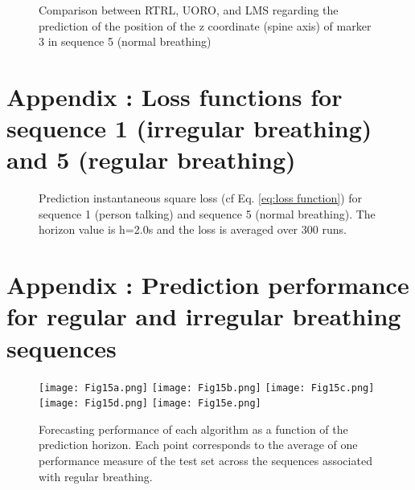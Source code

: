\documentclass[twocolumn,a4paper]{svjour3} \sloppy          \smartqed
\begin{document}
\begin{figure}[hbt!]
	
    \centering
    \quad
    \quad
    \caption{Comparison between RTRL, UORO, and LMS regarding the prediction of the position of the z coordinate (spine axis) of marker 3 in sequence 5 (normal breathing)}\label{fig:coordz_marker3_seq5}\end{figure}

\clearpage


\section{Appendix : Loss functions for sequence 1 (irregular breathing) and 5 (regular breathing)}\label{appendix:loss functions}

\begin{figure}[hbt!]
    \centering
    \quad
    \quad
    \quad
    \quad
    \quad
    \quad                  
    \caption{Prediction instantaneous square loss (cf Eq. \ref{eq:loss function}) for sequence 1 (person talking) and sequence 5 (normal breathing). The horizon value is h=2.0s and the loss is averaged over 300 runs. }
    \label{fig:loss function}
\end{figure}


\clearpage

\section{Appendix : Prediction performance for regular and irregular breathing sequences}\label{appendix:pred perf}

\begin{figure*}[htb!]
    \centering
    \texttt{[image: Fig15a.png]}\qquad
    \texttt{[image: Fig15b.png]}\qquad
    \texttt{[image: Fig15c.png]}\qquad
    \texttt{[image: Fig15d.png]}\qquad
    \texttt{[image: Fig15e.png]}\caption{Forecasting performance of each algorithm as a function of the prediction horizon. Each point corresponds to the average of one performance measure of the test set across the sequences associated with regular breathing. }
    \label{fig:pred perf regular}
\end{figure*}
\end{document}
